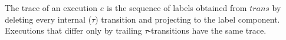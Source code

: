 \begin{definition}[Trace]
  \label{def:trace}
  \leanok
  The trace of an execution $e$ is the sequence of labels obtained from $trans$ by deleting every internal ($\tau$) transition and projecting to the label component.
  Executions that differ only by trailing $\tau$-transitions have the same trace.
\end{definition}
